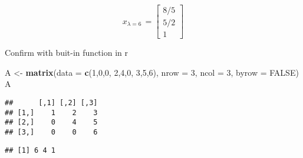 \documentclass[]{article}
\newenvironment{Shaded}{\begin{snugshade}}{\end{snugshade}}
\newcommand{\DataTypeTok}[1]{\textcolor[rgb]{0.13,0.29,0.53}{#1}}
\newcommand{\DecValTok}[1]{\textcolor[rgb]{0.00,0.00,0.81}{#1}}
\newcommand{\KeywordTok}[1]{\textcolor[rgb]{0.13,0.29,0.53}{\textbf{#1}}}
\newcommand{\NormalTok}[1]{#1}
\newcommand{\OperatorTok}[1]{\textcolor[rgb]{0.81,0.36,0.00}{\textbf{#1}}}
\newcommand{\OtherTok}[1]{\textcolor[rgb]{0.56,0.35,0.01}{#1}}
\newcommand{\StringTok}[1]{\textcolor[rgb]{0.31,0.60,0.02}{#1}}
\begin{document}
\[x_{\lambda=6}\,=\begin{bmatrix}8/5 \\5/2 \\1\end{bmatrix}\]

Confirm with buit-in function in r

\begin{Shaded}
\begin{Highlighting}[]
\NormalTok{A <-}\StringTok{ }\KeywordTok{matrix}\NormalTok{(}\DataTypeTok{data =} \KeywordTok{c}\NormalTok{(}\DecValTok{1}\NormalTok{,}\DecValTok{0}\NormalTok{,}\DecValTok{0}\NormalTok{,}
                     \DecValTok{2}\NormalTok{,}\DecValTok{4}\NormalTok{,}\DecValTok{0}\NormalTok{,}
                     \DecValTok{3}\NormalTok{,}\DecValTok{5}\NormalTok{,}\DecValTok{6}\NormalTok{), }\DataTypeTok{nrow =} \DecValTok{3}\NormalTok{, }\DataTypeTok{ncol =} \DecValTok{3}\NormalTok{, }\DataTypeTok{byrow =} \OtherTok{FALSE}\NormalTok{)}
\NormalTok{A}
\end{Highlighting}
\end{Shaded}

\begin{verbatim}
##      [,1] [,2] [,3]
## [1,]    1    2    3
## [2,]    0    4    5
## [3,]    0    0    6
\end{verbatim}

\begin{Shaded}
\end{Shaded}

\begin{verbatim}
## [1] 6 4 1
\end{verbatim}
\end{document}
